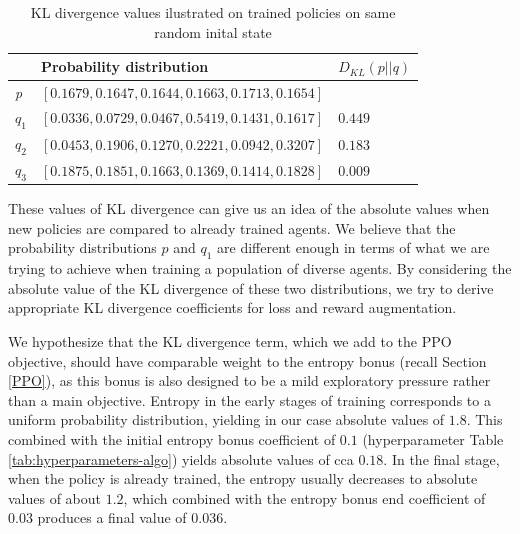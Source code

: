 \begin{table}[htbp]
    \small
    \centering
    \begin{tabular}{lll}
      \toprule
      \                                & Probability distribution     & $D_{KL}(p||q)$         \\ \midrule
      \textit{p}     &$[0.1679, 0.1647, 0.1644, 0.1663, 0.1713, 0.1654]$                                   &                                   \\ \midrule            
      $q_1$                     & $[0.0336, 0.0729, 0.0467, 0.5419, 0.1431, 0.1617]$                            & $0.449$                            \\
      $q_2$                         & $[0.0453, 0.1906, 0.1270, 0.2221, 0.0942, 0.3207]$                            & $0.183$                            \\
      $q_3$                                & $[0.1875, 0.1851, 0.1663, 0.1369, 0.1414, 0.1828]$                         & $0.009$                               \\
      
     \bottomrule
    \end{tabular}
    \caption{KL divergence values ilustrated on trained policies on same random inital state}
    \label{tab:KLDiv-distributions}
\end{table}

These values of KL divergence can give us an idea of the absolute values when new policies are compared to already trained agents.
We believe that the probability distributions $p$ and $q_1$ are different enough in terms of what we are trying to achieve when training a population of diverse agents.
By considering the absolute value of the KL divergence of these two distributions, we try to derive appropriate KL divergence coefficients for loss and reward augmentation.

We hypothesize that the KL divergence term, which we add to the PPO objective, should have comparable weight to the entropy bonus (recall Section \ref{PPO}), as this bonus is also designed to be a mild exploratory pressure rather than a main objective.
Entropy in the early stages of training corresponds to a uniform probability distribution, yielding in our case absolute values of $1.8$. 
This combined with the initial entropy bonus coefficient of $0.1$ (hyperparameter Table \ref{tab:hyperparameters-algo}) yields absolute values of cca $0.18$.
In the final stage, when the policy is already trained, the entropy usually decreases to absolute values of about $1.2$, which combined with the entropy bonus end coefficient of $0.03$ produces a final value of $0.036$.


